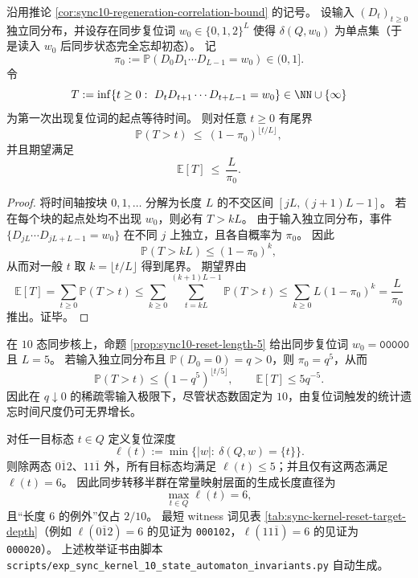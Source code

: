 \begin{proposition}[i.i.d. 输入下的复位等待时间尾界与期望界]\label{prop:sync10-reset-waitingtime-iid-bound}
沿用推论 \ref{cor:sync10-regeneration-correlation-bound} 的记号。
设输入 \((D_t)_{t\ge 0}\) 独立同分布，并设存在同步复位词 \(w_0\in\{0,1,2\}^L\) 使得 \(\delta(Q,w_0)\) 为单点集（于是读入 \(w_0\) 后同步状态完全忘却初态）。
记
\[
\pi_0:=\mathbb P(D_0D_1\cdots D_{L-1}=w_0)\in(0,1].
\]
令
\[
T:=\inf\{t\ge 0:\ D_tD_{t+1}\cdots D_{t+L-1}=w_0\}\in\NN\cup\{\infty\}
\]
为第一次出现复位词的起点等待时间。
则对任意 \(t\ge 0\) 有尾界
\[
\mathbb P(T>t)\ \le\ (1-\pi_0)^{\lfloor t/L\rfloor},
\]
并且期望满足
\[
\mathbb E[T]\ \le\ \frac{L}{\pi_0}.
\]
\end{proposition}
\begin{proof}
将时间轴按块 \(0,1,\dots\) 分解为长度 \(L\) 的不交区间 \([jL,(j+1)L-1]\)。
若在每个块的起点处均不出现 \(w_0\)，则必有 \(T>kL\)。
由于输入独立同分布，事件 \(\{D_{jL}\cdots D_{jL+L-1}=w_0\}\) 在不同 \(j\) 上独立，且各自概率为 \(\pi_0\)。
因此
\[
\mathbb P(T>kL)\le (1-\pi_0)^k,
\]
从而对一般 \(t\) 取 \(k=\lfloor t/L\rfloor\) 得到尾界。
期望界由
\[
\mathbb E[T]=\sum_{t\ge 0}\mathbb P(T>t)\le \sum_{k\ge 0}\sum_{t=kL}^{(k+1)L-1}\mathbb P(T>t)
\le \sum_{k\ge 0}L(1-\pi_0)^k=\frac{L}{\pi_0}
\]
推出。证毕。
\end{proof}

\begin{corollary}[10 态同步核在稀疏零输入下的记忆视界增长]\label{cor:sync10-memory-horizon-input-statistics}
在 \(10\) 态同步核上，命题 \ref{prop:sync10-reset-length-5} 给出同步复位词 \(w_0=\texttt{00000}\) 且 \(L=5\)。
若输入独立同分布且 \(\mathbb P(D_0=0)=q>0\)，则 \(\pi_0=q^5\)，从而
\[
\mathbb P(T>t)\le (1-q^5)^{\lfloor t/5\rfloor},
\qquad
\mathbb E[T]\le 5q^{-5}.
\]
因此在 \(q\downarrow 0\) 的稀疏零输入极限下，尽管状态数固定为 \(10\)，由复位词触发的统计遗忘时间尺度仍可无界增长。
\end{corollary}

\begin{proposition}\label{prop:sync10-reset-depth-spectrum}
对任一目标态 \(t\in Q\) 定义复位深度
\[
\ell(t):=\min\{|w|:\ \delta(Q,w)=\{t\}\}.
\]
则除两态 \(0\overline{1}2\)、\(11\overline{1}\) 外，所有目标态均满足 \(\ell(t)\le 5\)；并且仅有这两态满足 \(\ell(t)=6\)。
因此同步转移半群在常量映射层面的生成长度直径为
\[
\max_{t\in Q}\ell(t)=6,
\]
且“长度 \(6\) 的例外”仅占 \(2/10\)。
最短 witness 词见表 \ref{tab:sync-kernel-reset-target-depth}（例如 \(\ell(0\overline{1}2)=6\) 的见证为 \texttt{000102}，\(\ell(11\overline{1})=6\) 的见证为 \texttt{000020}）。
上述枚举证书由脚本 \texttt{scripts/exp\_sync\_kernel\_10\_state\_automaton\_invariants.py} 自动生成。
\end{proposition}

